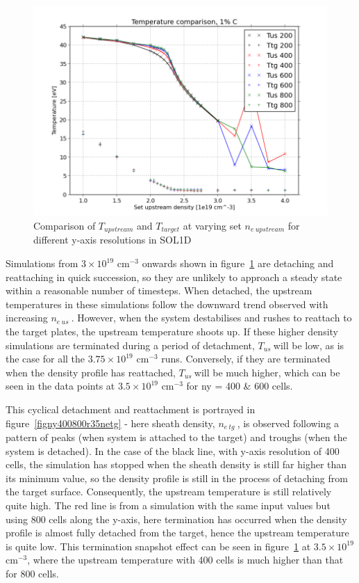 \documentclass[12pt]{article}  %
\providecommand{\noNe}[1]{{${#1}\times 10^{19}$ cm$^{-3}$}} %
\providecommand{\neus}{$n_{e~us}~$} %
\providecommand{\netg}{$n_{e~tg}~$} %
\providecommand{\Tus}{$T_{us}~$} %
\begin{document}
\begin{figure}
\includegraphics[scale=0.5]{Figures/sol1d/TT_IMPCOMBO2.png}
\centering
\caption{Comparison of $T_{upstream}$ and $T_{target}$ at varying set $n_{e~upstream}$ for different y-axis resolutions in SOL1D}\label{figTT_IMPCOMBO2}
\end{figure}

Simulations from \noNe{3} onwards shown in figure~\ref{figTT_IMPCOMBO2} are detaching and reattaching in quick succession, so they are unlikely to approach a steady state within a reasonable number of timesteps. When detached, the upstream temperatures in these simulations follow the downward trend observed with increasing \neus. However, when the system destabilises and rushes to reattach to the target plates, the upstream temperature shoots up. If these higher density simulations are terminated during a period of detachment, \Tus will be low, as is the case for all the \noNe{3.75} runs. Conversely, if they are terminated when the density profile has reattached, \Tus will be much higher, which can be seen in the data points at \noNe{3.5} for ny = 400 \& 600 cells. 

This cyclical detachment and reattachment is portrayed in figure~\ref{figny400800r35netg} - here sheath density, \netg, is observed following a pattern of peaks (when system is attached to the target) and troughs (when the system is detached). In the case of the black line, with y-axis resolution of 400 cells, the simulation has stopped when the sheath density is still far higher than its minimum value, so the density profile is still in the process of detaching from the target surface. Consequently, the upstream temperature is still relatively quite high. The red line is from a simulation with the same input values but using 800 cells along the y-axis, here termination has occurred when the density profile is almost fully detached from the target, hence the upstream temperature is quite low. This termination snapshot effect can be seen in figure~\ref{figTT_IMPCOMBO2} at \noNe{3.5}, where the upstream temperature with 400 cells is much higher than that for 800 cells.
\end{document}
